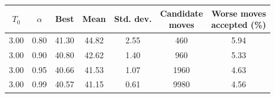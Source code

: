 \begin{tabular}{ccccccc}
\toprule
$T_0$ & $\alpha$ & Best & Mean & Std. dev. & \makecell{Candidate\\moves} & \makecell{Worse moves\\accepted (\%)} \\
\midrule
3.00 & 0.80 & 41.30 & 44.82 & 2.55 & 460 & 5.94 \\
3.00 & 0.90 & 40.80 & 42.62 & 1.40 & 960 & 5.33 \\
3.00 & 0.95 & 40.66 & 41.53 & 1.07 & 1960 & 4.63 \\
3.00 & 0.99 & 40.57 & 41.15 & 0.61 & 9980 & 4.56 \\
\bottomrule
\end{tabular}
